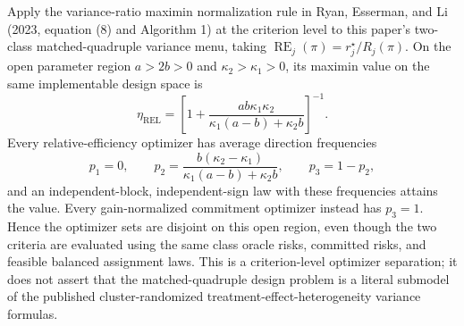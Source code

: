 Apply the variance-ratio maximin normalization rule in Ryan, Esserman, and Li (2023, equation (8) and Algorithm 1) at the criterion level to this paper's two-class matched-quadruple variance menu, taking \(\operatorname{RE}_j(\pi)=r_j^\star/R_j(\pi)\). On the open parameter region \(a>2b>0\) and \(\kappa_2>\kappa_1>0\), its maximin value on the same implementable design space is
\[
\eta_{\mathrm{REL}}=\left[1+\frac{ab\kappa_1\kappa_2}{\kappa_1(a-b)+\kappa_2b}\right]^{-1}.
\]
Every relative-efficiency optimizer has average direction frequencies
\[
p_1=0,\qquad
p_2=\frac{b(\kappa_2-\kappa_1)}{\kappa_1(a-b)+\kappa_2b},\qquad
p_3=1-p_2,
\]
and an independent-block, independent-sign law with these frequencies attains the value. Every gain-normalized commitment optimizer instead has \(p_3=1\). Hence the optimizer sets are disjoint on this open region, even though the two criteria are evaluated using the same class oracle risks, committed risks, and feasible balanced assignment laws. This is a criterion-level optimizer separation; it does not assert that the matched-quadruple design problem is a literal submodel of the published cluster-randomized treatment-effect-heterogeneity variance formulas.